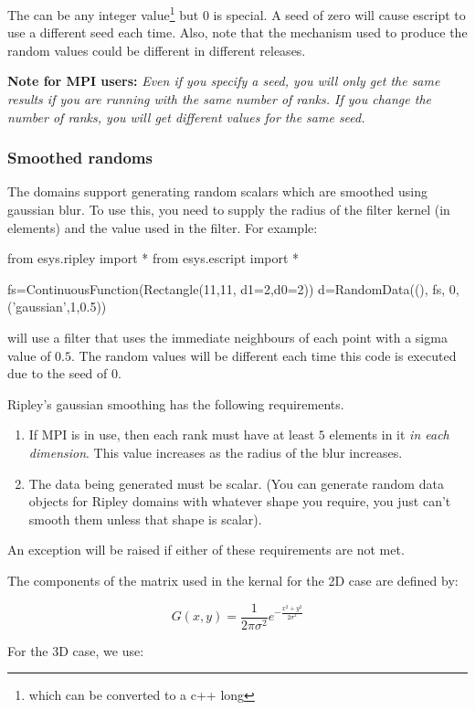 The  can be any integer value\footnote{which can be converted to a c++ long} but 0 is special.
A seed of zero will cause escript to use a different seed each time. Also, note that the mechanism used
to produce the random values could be different in different releases.

\noindent\textbf{Note for MPI users:}
\textsl{
Even if you specify a seed, you will only get the same results if you are running with the same
number of ranks.
If you change the number of ranks, you will get different values for the same seed.
}

\subsubsection{Smoothed randoms}
The  domains support generating random scalars which are smoothed using gaussian blur.
To use this, you need to supply the radius of the filter kernel (in elements) and the  value used in the filter.
For example:
\begin{python}
from esys.ripley import *
from esys.escript import *

fs=ContinuousFunction(Rectangle(11,11, d1=2,d0=2))
d=RandomData((), fs, 0, ('gaussian',1,0.5))
\end{python}
will use a filter that uses the immediate neighbours of each point with a sigma value of $0.5$.
The random values will be different each time this code is executed due to the seed of $0$.

Ripley's gaussian smoothing has the following requirements.
\begin{enumerate}
 \item If MPI is in use, then each rank must have at least $5$ elements in it \emph{in each dimension}.
   This value increases as the radius of the blur increases.
 \item The data being generated must be scalar. (You can generate random data objects for Ripley domains
 with whatever shape you require, you just can't smooth them unless that shape is scalar).
\end{enumerate}
An exception will be raised if either of these requirements are not met. 

The components of the matrix used in the kernal for the 2D case are defined\cite{gaussfilter} by:

\[ G(x,y) = \frac{1}{2\pi\sigma^2} e^{-\frac{x^2+y^2}{2\sigma^2}} \]

For the 3D case, we use:

